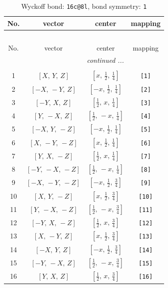 \documentclass[fleqn,8pt]{jsarticle}
\begin{document}
\begin{longtable}{cccc}
\caption{Wyckoff bond: {\tt 16c@8l}, bond symmetry: {\tt 1}}
 \\
 \hline \hline
No. & vector & center & mapping \\ \hline \endfirsthead

\multicolumn{3}{l}{\tablename\ \thetable{}} \\
 \hline \hline
No. & vector & center & mapping \\ \hline \endhead

 \hline \hline
\multicolumn{3}{r}{\footnotesize\it continued ...} \\ \endfoot

 \hline \hline
\multicolumn{3}{r}{} \\ \endlastfoot

1 & $\left[ X,\, Y,\, Z \right]$ & $\left[ x,\, \frac{1}{2},\, \frac{1}{4} \right]$ & {\tt [1]} \\ \hline
2 & $\left[ - X,\, - Y,\, Z \right]$ & $\left[ - x,\, \frac{1}{2},\, \frac{1}{4} \right]$ & {\tt [2]} \\ \hline
3 & $\left[ - Y,\, X,\, Z \right]$ & $\left[ \frac{1}{2},\, x,\, \frac{1}{4} \right]$ & {\tt [3]} \\ \hline
4 & $\left[ Y,\, - X,\, Z \right]$ & $\left[ \frac{1}{2},\, - x,\, \frac{1}{4} \right]$ & {\tt [4]} \\ \hline
5 & $\left[ - X,\, Y,\, - Z \right]$ & $\left[ - x,\, \frac{1}{2},\, \frac{1}{4} \right]$ & {\tt [5]} \\ \hline
6 & $\left[ X,\, - Y,\, - Z \right]$ & $\left[ x,\, \frac{1}{2},\, \frac{1}{4} \right]$ & {\tt [6]} \\ \hline
7 & $\left[ Y,\, X,\, - Z \right]$ & $\left[ \frac{1}{2},\, x,\, \frac{1}{4} \right]$ & {\tt [7]} \\ \hline
8 & $\left[ - Y,\, - X,\, - Z \right]$ & $\left[ \frac{1}{2},\, - x,\, \frac{1}{4} \right]$ & {\tt [8]} \\ \hline
9 & $\left[ - X,\, - Y,\, - Z \right]$ & $\left[ - x,\, \frac{1}{2},\, \frac{3}{4} \right]$ & {\tt [9]} \\ \hline
10 & $\left[ X,\, Y,\, - Z \right]$ & $\left[ x,\, \frac{1}{2},\, \frac{3}{4} \right]$ & {\tt [10]} \\ \hline
11 & $\left[ Y,\, - X,\, - Z \right]$ & $\left[ \frac{1}{2},\, - x,\, \frac{3}{4} \right]$ & {\tt [11]} \\ \hline
12 & $\left[ - Y,\, X,\, - Z \right]$ & $\left[ \frac{1}{2},\, x,\, \frac{3}{4} \right]$ & {\tt [12]} \\ \hline
13 & $\left[ X,\, - Y,\, Z \right]$ & $\left[ x,\, \frac{1}{2},\, \frac{3}{4} \right]$ & {\tt [13]} \\ \hline
14 & $\left[ - X,\, Y,\, Z \right]$ & $\left[ - x,\, \frac{1}{2},\, \frac{3}{4} \right]$ & {\tt [14]} \\ \hline
15 & $\left[ - Y,\, - X,\, Z \right]$ & $\left[ \frac{1}{2},\, - x,\, \frac{3}{4} \right]$ & {\tt [15]} \\ \hline
16 & $\left[ Y,\, X,\, Z \right]$ & $\left[ \frac{1}{2},\, x,\, \frac{3}{4} \right]$ & {\tt [16]} \\
\end{longtable}
\end{document}

